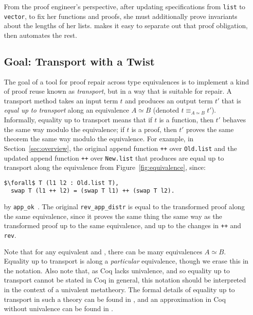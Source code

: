 From the proof engineer's perspective, after updating specifications from \lstinline{list} to \lstinline{vector},
to fix her functions and proofs, she must additionally prove invariants about the lengths of her lists.
\toolname makes it easy to separate out that proof obligation, then automates the rest.

\subsection{Goal: Transport with a Twist}
\label{sec:repair}

The goal of a tool for proof repair across type equivalences is to implement a kind of proof reuse known as \textit{transport},
but in a way that is suitable for repair.
A transport method takes an input term $t$ and produces an output term $t'$ that is \textit{equal up to transport}
along an equivalence $A \simeq B$ (denoted $t \equiv_{A \simeq B} t'$).
Informally, equality up to transport means that if $t$ is a function, then $t'$ behaves the same way modulo the equivalence;
if $t$ is a proof, then $t'$ proves the same theorem the same way modulo the equivalence.
For example, in Section~\ref{sec:overview}, the original append function \lstinline{++} over \lstinline{Old.list}
and the updated append function \lstinline{++} over \lstinline{New.list} that \toolname produces are
equal up to transport along the equivalence from Figure~\ref{fig:equivalence}, since:

\begin{lstlisting}
$\forall$ T (l1 l2 : Old.list T),
  swap T (l1 ++ l2) = (swap T l1) ++ (swap T l2).
\end{lstlisting}
by \lstinline{app_ok}~.
The original \lstinline{rev_app_distr} is equal to the transformed proof along the same equivalence,
since it proves the same thing the same way as the transformed proof up to the same equivalence, and up to the changes in \lstinline{++}
and \lstinline{rev}.

Note that for any equivalent \A and \B, there can be many equivalences $A \simeq B$.
Equality up to transport is along a \textit{particular} equivalence, though we erase this in the notation.
Also note that, as Coq lacks univalence, and so equality up to transport cannot be stated in Coq in general,
this notation should be interpreted in the context of a univalent metatheory.
The formal details of equality up to transport in such a theory can be found in \citet{univalent2013homotopy}, and an approximation in Coq without univalence can be found in \citet{tabareau2017equivalences}.

